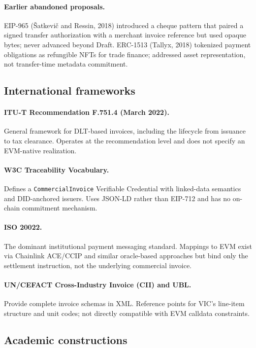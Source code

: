 \documentclass[11pt,a4paper]{article}
\begin{document}
\paragraph{Earlier abandoned proposals.} EIP-965 (Šatkevič and Ressin, 2018) introduced a cheque pattern that paired a signed transfer authorization with a merchant invoice reference but used opaque bytes; never advanced beyond Draft. ERC-1513 (Tallyx, 2018) tokenized payment obligations as refungible NFTs for trade finance; addressed asset representation, not transfer-time metadata commitment.

\subsection{International frameworks}

\paragraph{ITU-T Recommendation F.751.4 (March 2022).} General framework for DLT-based invoices, including the lifecycle from issuance to tax clearance. Operates at the recommendation level and does not specify an EVM-native realization.

\paragraph{W3C Traceability Vocabulary.} Defines a \texttt{CommercialInvoice} Verifiable Credential with linked-data semantics and DID-anchored issuers. Uses JSON-LD rather than EIP-712 and has no on-chain commitment mechanism.

\paragraph{ISO 20022.} The dominant institutional payment messaging standard. Mappings to EVM exist via Chainlink ACE/CCIP and similar oracle-based approaches but bind only the settlement instruction, not the underlying commercial invoice.

\paragraph{UN/CEFACT Cross-Industry Invoice (CII) and UBL.} Provide complete invoice schemas in XML. Reference points for VIC's line-item structure and unit codes; not directly compatible with EVM calldata constraints.

\subsection{Academic constructions}
\end{document}
